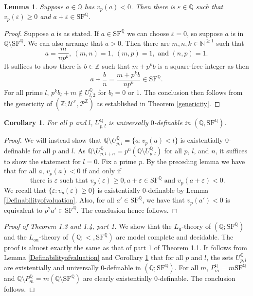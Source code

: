 \documentclass[letterpaper]{amsart}
\newcommand{\qq}{\mathbb{Q}}
\newcommand{\nn}{\mathbb{N}}
\newcommand{\zz}{\mathbb{Z}}
\newcommand{\sU}{\mathscr{U}}
\newcommand{\sP}{\mathscr{P}}
\newcommand{\SQ}{\mathrm{SF}^\qq}
\newtheorem{lem}[thm]{Lemma}
\newtheorem{cor}[thm]{Corollary}
\begin{document}
\begin{lem}
Suppose $a\in \qq$ has $v_p(a)<0$. Then there is $\varepsilon \in \qq$ such that $v_p(\varepsilon) \geq 0$ and $a+\varepsilon \in \SQ$.
\end{lem}
\begin{proof}
Suppose $a$ is as stated. If $a \in \SQ$ we can choose $\varepsilon =0$, so suppose $a$ is in $\qq \setminus \SQ$. We can also arrange that $a>0$. Then there are $m, n, k \in \nn^{\geq 1}$ such that 
$$a = \frac{m}{np^k},\  (m, n)=1,\  (m, p)=1, \text{ and } (n, p)=1.$$ 
It suffices to show there is $b \in \zz$ such that $m+ p^kb$ is a square-free integer as then
$$a+ \frac{b}{n} = \frac{m+ p^kb}{np^k} \in \SQ.$$
For all prime $l$,  $p^kb_l+m \notin U^\qq_{l,2}$ for $b_l=0$ or $1$.  The  conclusion then follows from the genericity of $( \zz; \sU^\zz, \sP^\zz)$ as established in Theorem \ref{genericity}.
\end{proof}

\begin{cor}\label{Uni}
For all $p$ and $l$, $U^\qq_{p, l}$ is universally $0$-definable in $(\qq, \SQ)$.
\end{cor}
\begin{proof}
We will instead show that $\qq\setminus U^\qq_{p, l} = \{ a : v_p(a) < l \}$ is existentially $0$-definable for all $p$ and $l$. As $\qq \setminus U^\qq_{p, l+n} = p^n( \qq \setminus U^\qq_{p, l})$ for all $p$, $l$, and $n$, it suffices to show the statement for  $l=0$. Fix a prime $p$. 
By the preceding lemma we have that  for all $ a$, $v_p(a)<0$ if and only if  
$$ \text{ there is } \varepsilon \text{ such that } v_p(\varepsilon) \geq 0,  
 a+\varepsilon \in \SQ \text{ and } v_p(a+\varepsilon) <0.$$ 
We recall that $\{\varepsilon : v_p(\varepsilon) \geq 0 \}$ is existentially $0$-definable by Lemma \ref{Definabilityofvaluation}. Also, for all $a' \in \SQ$, we have that $v_p(a')< 0$ is equivalent to $p^2a' \in \SQ$. The conclusion hence follows.
\end{proof}


\begin{proof}[Proof of Theorem 1.3 and 1.4, part 1] We show that the $L_{\mathrm{u}}$-theory of $(\qq; \SQ)$ and the $L_{\mathrm{ou}}$-theory of $(\qq; <, \SQ )$ are model complete and decidable. The proof is almost exactly the same as that of part 1 of Theorem 1.1. It follows from Lemma \ref{Definabilityofvaluation} and Corollary \ref{Uni} that for all $p$ and $l$, the sets $U^\qq_{p, l}$ are existentially and universally $0$-definable in $(\qq; \SQ)$.  For all $m$, $P^\qq_m = m\SQ$ and $\qq \setminus P^\qq_m = m( \qq \setminus \SQ)$ are clearly existentially $0$-definable. The conclusion follows. 
\end{proof}
\end{document}
